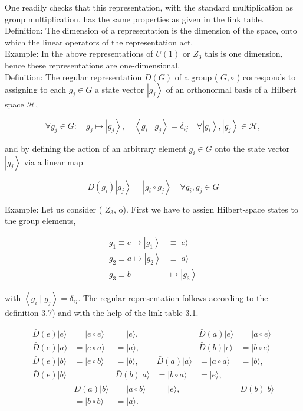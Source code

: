 \documentclass[10pt, letterpaper]{article}
\begin{document}
One readily checks that this representation, with the standard multiplication as group multiplication, has the same properties as given in the link table.\\
Definition: The dimension of a representation is the dimension of the space, onto which the linear operators of the representation act.\\
Example: In the above representations of $U(1)$ or $Z_{3}$ this is one dimension, hence these representations are one-dimensional.\\
Definition: The regular representation $\bar{D}(G)$ of a group ( $G, \circ$ ) corresponds to assigning to each $g_{j} \in G$ a state vector $\left|g_{j}\right\rangle$ of an orthonormal basis of a Hilbert space $\mathcal{H}$,

$$
\forall g_{j} \in G: \quad g_{j} \mapsto\left|g_{j}\right\rangle, \quad\left\langle g_{i} \mid g_{j}\right\rangle=\delta_{i j} \quad \forall\left|g_{i}\right\rangle,\left|g_{j}\right\rangle \in \mathcal{H},
$$

and by defining the action of an arbitrary element $g_{i} \in G$ onto the state vector $\left|g_{j}\right\rangle$ via a linear map

$$
\bar{D}\left(g_{i}\right)\left|g_{j}\right\rangle=\left|g_{i} \circ g_{j}\right\rangle \quad \forall g_{i}, g_{j} \in G
$$

Example: Let us consider ( $Z_{3}$, o). First we have to assign Hilbert-space states to the group elements,

$$
\begin{aligned}
g_{1} \equiv e \mapsto\left|g_{1}\right\rangle & \equiv|e\rangle \\
g_{2} \equiv a \mapsto\left|g_{2}\right\rangle & \equiv|a\rangle \\
g_{3} \equiv b & \mapsto\left|g_{3}\right\rangle
\end{aligned}
$$

with $\left\langle g_{i} \mid g_{j}\right\rangle=\delta_{i j}$. The regular representation follows according to the definition 3.7) and with the help of the link table 3.1.

$$
\begin{array}{rlrlrl}
\bar{D}(e)|e\rangle & =|e \circ e\rangle & =|e\rangle, & & \bar{D}(a)|e\rangle & =|a \circ e\rangle \\
\bar{D}(e)|a\rangle & =|e \circ a\rangle & =|a\rangle, & & \bar{D}(b)|e\rangle & =|b \circ e\rangle \\
\bar{D}(e)|b\rangle & =|e \circ b\rangle & =|b\rangle, & \bar{D}(a)|a\rangle & =|a \circ a\rangle & =|b\rangle, \\
\bar{D}(e)|b\rangle & & \bar{D}(b)|a\rangle & =|b \circ a\rangle & =|e\rangle, \\
& \bar{D}(a)|b\rangle & =|a \circ b\rangle & =|e\rangle, & & \bar{D}(b)|b\rangle \\
& =|b \circ b\rangle & =|a\rangle .
\end{array}
$$
\end{document}
